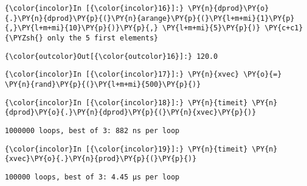     \begin{Verbatim}[commandchars=\\\{\}]
{\color{incolor}In [{\color{incolor}16}]:} \PY{n}{dprod}\PY{o}{.}\PY{n}{dprod}\PY{p}{(}\PY{n}{arange}\PY{p}{(}\PY{l+m+mi}{1}\PY{p}{,}\PY{l+m+mi}{10}\PY{p}{)}\PY{p}{,} \PY{l+m+mi}{5}\PY{p}{)} \PY{c+c1}{\PYZsh{} only the 5 first elements}
\end{Verbatim}

            \begin{Verbatim}[commandchars=\\\{\}]
{\color{outcolor}Out[{\color{outcolor}16}]:} 120.0
\end{Verbatim}
        


    \begin{Verbatim}[commandchars=\\\{\}]
{\color{incolor}In [{\color{incolor}17}]:} \PY{n}{xvec} \PY{o}{=} \PY{n}{rand}\PY{p}{(}\PY{l+m+mi}{500}\PY{p}{)}
\end{Verbatim}

    \begin{Verbatim}[commandchars=\\\{\}]
{\color{incolor}In [{\color{incolor}18}]:} \PY{n}{timeit} \PY{n}{dprod}\PY{o}{.}\PY{n}{dprod}\PY{p}{(}\PY{n}{xvec}\PY{p}{)}
\end{Verbatim}

    \begin{Verbatim}[commandchars=\\\{\}]
1000000 loops, best of 3: 882 ns per loop

    \end{Verbatim}

    \begin{Verbatim}[commandchars=\\\{\}]
{\color{incolor}In [{\color{incolor}19}]:} \PY{n}{timeit} \PY{n}{xvec}\PY{o}{.}\PY{n}{prod}\PY{p}{(}\PY{p}{)}
\end{Verbatim}

    \begin{Verbatim}[commandchars=\\\{\}]
100000 loops, best of 3: 4.45 µs per loop

    \end{Verbatim}






